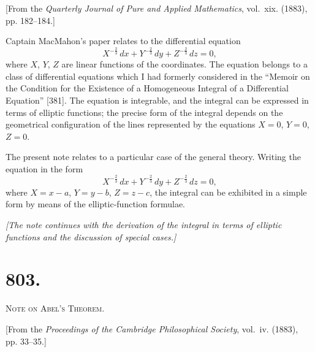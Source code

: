 \documentclass[11pt,a4paper]{article}
\theoremstyle{definition}
\theoremstyle{remark}
\begin{document}
\begin{flushright}
\small[From the \textit{Quarterly Journal of Pure and Applied Mathematics}, vol.~xix. (1883),\\
pp. 182--184.]
\end{flushright}

Captain MacMahon's paper relates to the differential equation
\[
X^{-\frac{2}{3}}\,dx + Y^{-\frac{2}{3}}\,dy + Z^{-\frac{2}{3}}\,dz = 0,
\]
where $X$, $Y$, $Z$ are linear functions of the coordinates. The equation belongs to a class of differential equations which I had formerly considered in the ``Memoir on the Condition for the Existence of a Homogeneous Integral of a Differential Equation'' [381]. The equation is integrable, and the integral can be expressed in terms of elliptic functions; the precise form of the integral depends on the geometrical configuration of the lines represented by the equations $X=0$, $Y=0$, $Z=0$.

The present note relates to a particular case of the general theory. Writing the equation in the form
\[
X^{-\frac{2}{3}}\,dx + Y^{-\frac{2}{3}}\,dy + Z^{-\frac{2}{3}}\,dz = 0,
\]
where $X = x - a$, $Y = y - b$, $Z = z - c$, the integral can be exhibited in a simple form by means of the elliptic-function formulae.

\vspace{0.5cm}
\noindent\textit{[The note continues with the derivation of the integral in terms of elliptic functions and the discussion of special cases.]}
\vspace{0.5cm}



\newpage
\section*{803.}
\begin{center}
{\large\scshape Note on Abel's Theorem.}
\end{center}

\begin{flushright}
\small[From the \textit{Proceedings of the Cambridge Philosophical Society}, vol.~iv. (1883),\\
pp. 33--35.]
\end{flushright}
\end{document}

